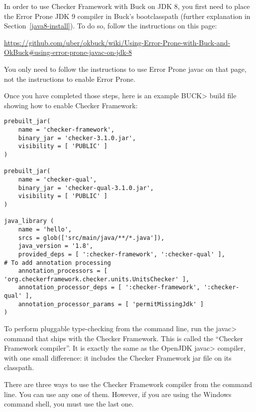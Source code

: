 In order to use Checker Framework with Buck on JDK 8, you first need
to place the Error Prone JDK 9 compiler in Buck's bootclasspath
(further explanation in Section~\ref{java8-install}).  To do so,
follow the instructions on this page:

{\codesize\url{https://github.com/uber/okbuck/wiki/Using-Error-Prone-with-Buck-and-OkBuck#using-error-prone-javac-on-jdk-8}}

You only need to follow the instructions to use Error Prone javac on
that page, not the instructions to enable Error Prone.

Once you have completed those steps, here is an example \<BUCK> build
file showing how to enable Checker Framework:

\begin{Verbatim}
prebuilt_jar(
    name = 'checker-framework',
    binary_jar = 'checker-3.1.0.jar',
    visibility = [ 'PUBLIC' ]
)

prebuilt_jar(
    name = 'checker-qual',
    binary_jar = 'checker-qual-3.1.0.jar',
    visibility = [ 'PUBLIC' ]
)

java_library (
    name = 'hello',
    srcs = glob(['src/main/java/**/*.java']),
    java_version = '1.8',
    provided_deps = [ ':checker-framework', ':checker-qual' ],
# To add annotation processing
    annotation_processors = [ 'org.checkerframework.checker.units.UnitsChecker' ],
    annotation_processor_deps = [ ':checker-framework', ':checker-qual' ],
    annotation_processor_params = [ 'permitMissingJdk' ]
)
\end{Verbatim}



\label{javac-installation}      %

To perform pluggable type-checking from the command line, run the \<javac>
command that ships with the Checker Framework.  This is called the
``Checker Framework compiler''.  It is exactly the same as the OpenJDK
\<javac> compiler, with one small difference:  it includes the Checker
Framework jar file on its classpath.

There are three ways to use the Checker Framework compiler from the command
line.  You can use any
one of them.  However, if you are using the Windows command shell, you must
use the last one.


